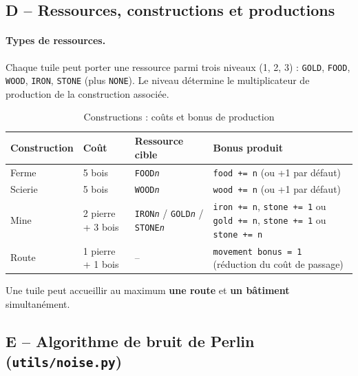 \documentclass[12pt, a4paper]{article}
\begin{document}
\subsection*{D – Ressources, constructions et productions}

\paragraph{Types de ressources.}
Chaque tuile peut porter une ressource parmi trois niveaux (1, 2, 3) :
\texttt{GOLD}, \texttt{FOOD}, \texttt{WOOD}, \texttt{IRON}, \texttt{STONE} (plus \texttt{NONE}).
Le niveau détermine le multiplicateur de production de la construction associée.

\begin{table}[H]
\centering
\caption{Constructions : coûts et bonus de production}
\label{tab:constructions}
\renewcommand{\arraystretch}{1.3}
\begin{tabular}{|l|l|l|p{6cm}|}
\hline
\textbf{Construction} & \textbf{Coût} & \textbf{Ressource cible} & \textbf{Bonus produit} \\
\hline
Ferme    & 5 bois & \texttt{FOOD\textit{n}} & \texttt{food += n} (ou +1 par défaut) \\
Scierie  & 5 bois & \texttt{WOOD\textit{n}} & \texttt{wood += n} (ou +1 par défaut) \\
Mine     & 2 pierre + 3 bois & \texttt{IRON\textit{n}} / \texttt{GOLD\textit{n}} / \texttt{STONE\textit{n}} &
    \texttt{iron += n}, \texttt{stone += 1} \quad ou\quad
    \texttt{gold += n}, \texttt{stone += 1} \quad ou\quad
    \texttt{stone += n} \\
Route    & 1 pierre + 1 bois & – & \texttt{movement bonus = 1} (réduction du coût de passage) \\
\hline
\end{tabular}
\end{table}

\noindent Une tuile peut accueillir au maximum \textbf{une route} et \textbf{un bâtiment} simultanément.

\subsection*{E – Algorithme de bruit de Perlin (\texttt{utils/noise.py})}
\end{document}
